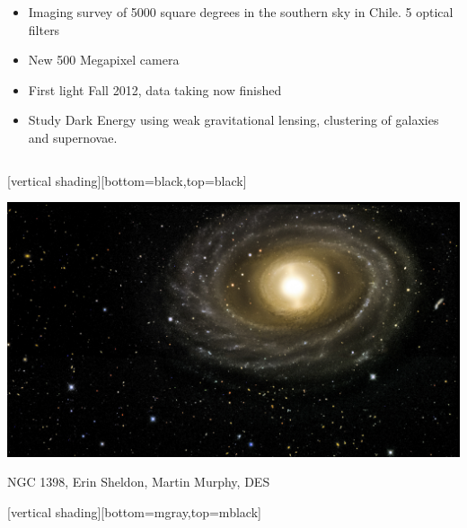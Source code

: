 \documentclass{beamer}
\begin{document}
{\begin{columns}
\begin{column}{0.6\textwidth}
\begin{itemize}
                \item Imaging survey of 5000 square degrees in the southern
                    sky in Chile.  5 optical filters

                \item New 500 Megapixel camera

                \item First light Fall 2012, data taking now finished

                \item Study Dark Energy using weak gravitational lensing,
                    clustering of galaxies and supernovae.

            \end{itemize}

        \end{column}

    \end{columns}

}

{
    [vertical shading][bottom=black,top=black]
	
    \frame
    {

        \begin{center}
            \includegraphics[width=1.1\textwidth]{DES-2013-01-medres.jpg}

            {\tiny \hfill NGC 1398, Erin Sheldon, Martin Murphy, DES}
        \end{center}
    }

    [vertical shading][bottom=mgray,top=mblack]

}
\end{document}
